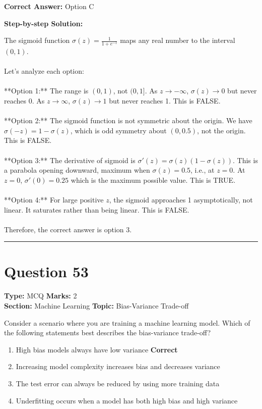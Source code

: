 \documentclass[11pt]{article}
\begin{document}
\textbf{Correct Answer:} Option C

\textbf{Step-by-step Solution:}

The sigmoid function \(\sigma(z) = \frac{1}{1 + e^{-z}}\) maps any real number to the interval \((0, 1)\). \\
\\
Let's analyze each option:\\
\\
**Option 1:** The range is \((0, 1)\), not \((0, 1]\). As \(z \to -\infty\), \(\sigma(z) \to 0\) but never reaches 0. As \(z \to \infty\), \(\sigma(z) \to 1\) but never reaches 1. This is FALSE.\\
\\
**Option 2:** The sigmoid function is not symmetric about the origin. We have \(\sigma(-z) = 1 - \sigma(z)\), which is odd symmetry about \((0, 0.5)\), not the origin. This is FALSE.\\
\\
**Option 3:** The derivative of sigmoid is \(\sigma'(z) = \sigma(z)(1 - \sigma(z))\). This is a parabola opening downward, maximum when \(\sigma(z) = 0.5\), i.e., at \(z = 0\). At \(z = 0\), \(\sigma'(0) = 0.25\) which is the maximum possible value. This is TRUE.\\
\\
**Option 4:** For large positive \(z\), the sigmoid approaches 1 asymptotically, not linear. It saturates rather than being linear. This is FALSE.\\
\\
Therefore, the correct answer is option 3.

\vspace{0.8em}
\hrule
\vspace{0.4em}
\section*{Question 53}
\textbf{Type:} MCQ \hfill \textbf{Marks:} 2\\
\textbf{Section:} Machine Learning \hfill \textbf{Topic:} Bias-Variance Trade-off

Consider a scenario where you are training a machine learning model. Which of the following statements best describes the bias-variance trade-off?


\begin{enumerate}[label=\textbf{\Alph*.}, leftmargin=1.8em]
\item High bias models always have low variance \hfill {\color{gategreen}\textbf{Correct}}\item Increasing model complexity increases bias and decreases variance\item The test error can always be reduced by using more training data\item Underfitting occurs when a model has both high bias and high variance\end{enumerate}
\end{document}

